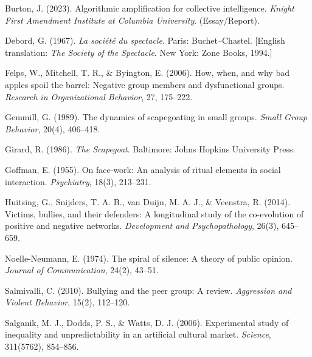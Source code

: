 \documentclass[11pt]{article}
\theoremstyle{definition}
\begin{document}
\begin{thebibliography}{99}

Burton, J. (2023). Algorithmic amplification for collective intelligence. \emph{Knight First Amendment Institute at Columbia University}. (Essay/Report).

Debord, G. (1967). \emph{La soci\'et\'e du spectacle}. Paris: Buchet--Chastel. [English translation: \emph{The Society of the Spectacle}. New York: Zone Books, 1994.]

Felps, W., Mitchell, T. R., \& Byington, E. (2006).
How, when, and why bad apples spoil the barrel: Negative group members and dysfunctional groups.
\emph{Research in Organizational Behavior}, 27, 175--222.

Gemmill, G. (1989).
The dynamics of scapegoating in small groups.
\emph{Small Group Behavior}, 20(4), 406--418.

Girard, R. (1986).
\emph{The Scapegoat}.
Baltimore: Johns Hopkins University Press.

Goffman, E. (1955).
On face-work: An analysis of ritual elements in social interaction.
\emph{Psychiatry}, 18(3), 213--231.

Huitsing, G., Snijders, T. A. B., van Duijn, M. A. J., \& Veenstra, R. (2014).
Victims, bullies, and their defenders: A longitudinal study of the co-evolution of positive and negative networks.
\emph{Development and Psychopathology}, 26(3), 645--659.

Noelle-Neumann, E. (1974).
The spiral of silence: A theory of public opinion.
\emph{Journal of Communication}, 24(2), 43--51.

Salmivalli, C. (2010).
Bullying and the peer group: A review.
\emph{Aggression and Violent Behavior}, 15(2), 112--120.

Salganik, M. J., Dodds, P. S., \& Watts, D. J. (2006).
Experimental study of inequality and unpredictability in an artificial cultural market.
\emph{Science}, 311(5762), 854--856.

\end{thebibliography}
\end{document}
